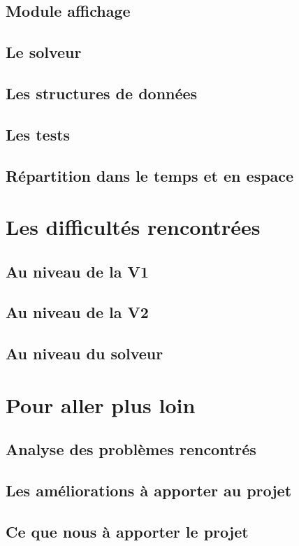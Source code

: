 \documentclass{report}
\begin{document}
\chapter{Module affichage}

\chapter{Le solveur}

\chapter{Les structures de données}

\chapter{Les tests}

\chapter{Répartition dans le temps et en espace}



\part{Les difficultés rencontrées}
\setcounter{chapter}{0}
\chapter{Au niveau de la V1}

\chapter{Au niveau de la V2}

\chapter{Au niveau du solveur}



\part{Pour aller plus loin}
\setcounter{chapter}{0}
\chapter{Analyse des problèmes rencontrés}

\chapter{Les améliorations à apporter au projet}

\chapter{Ce que nous à apporter le projet}
\end{document}
